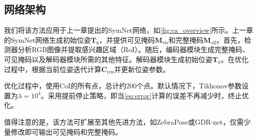 \subsection{网络架构}

我们将该方法应用于上一章提出的SymNet网络，如\autoref{fig:ca_overview}所示。上一章的SymNet网络生成初始位姿$\bm{T}_0$，并提供可见掩码$\bm{M}_\text{vis}$和完整掩码$\bm{M}_\text{all}$。首先，检测器分析RGB图像并提取感兴趣区域（RoI）。随后，编码器模块生成完整掩码、可见掩码以及解码器模块所需的其他特征。解码器模块生成初始位姿$\bm{T}_0$。在优化过程中，根据当前位姿迭代计算$\bm{C}_\text{ren}$并更新位姿参数。

优化过程中，使用CoI的所有点，总计约200个点。默认情况下，Tikhonov参数设置为$\lambda = 10^4$。采用提前停止策略，即当\autoref{eq:error}计算的误差不再减少时，终止优化。

值得注意的是，该方法可扩展至其他先进方法，如ZebraPose\cite{su2022zebrapose}或GDR-net\cite{wang2021gdr}，仅需少量修改即可输出可见掩码和完整掩码。
